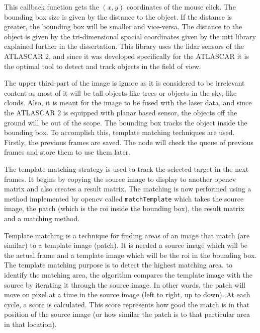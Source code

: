 This callback function gets the $(x,y)$ coordinates of the mouse click. The bounding box size is given by the distance to the object. If the distance is greater, the bounding box will be smaller and vice-versa. The distance to the object is given by the tri-dimensional spacial coordinates given by the \gls{mtt} library explained further in the dissertation. This library uses the \gls{lidar} sensors of the ATLASCAR 2, and since it was developed specifically for the ATLASCAR it is the optimal tool to detect and track objects in the field of view.

The upper third-part of the image is ignore as it is considered to be irrelevant content as most of it will be tall objects like trees or objects in the sky, like clouds. Also, it is meant for the image to be fused with the laser data, and since the ATLASCAR 2 is equipped with planar based sensor, the objects off the ground will be out of the scope. The bounding box tracks the object inside the bounding box. To accomplish this, template matching techniques are used. Firstly, the previous frames are saved. The node will check the queue of previous frames and store them to use them later. 

The template matching strategy is used to track the selected target in the next frames. It begins by copying the source image to display to another \gls{opencv} matrix and also creates a result matrix. The matching is now performed using a method implemented by \gls{opencv} called \texttt{matchTemplate} which takes the source image, the patch (which is the \gls{roi} inside the bounding box), the result matrix and a matching method. 

Template matching is a technique for finding areas of an image that match (are similar) to a template image (patch). It is needed a source image which will be the actual frame and a template image which will be the \gls{roi} in the bounding box. The template matching purpose is to detect the highest matching area. to identify the matching area, the algorithm compares the template image with the source by iterating it through the source image. In other words, the patch will move on pixel at a time in the source image  (left to right, up to down). At each cycle, a score is calculated. This score represents how good the match is in that position of the source image (or how similar the patch is to that particular area in that location). 

